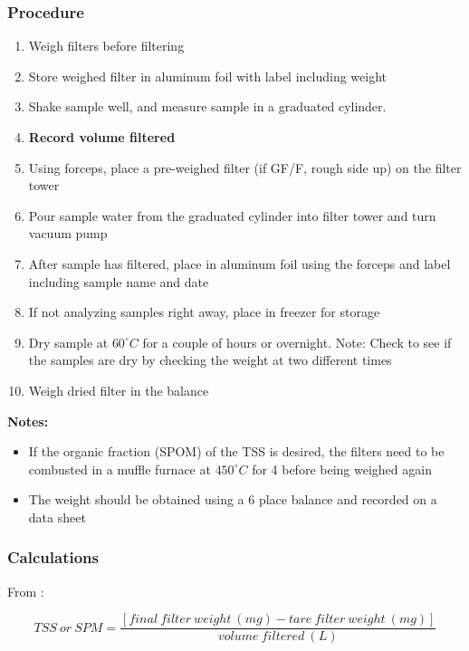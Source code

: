 \begin{appendices}
\begin{itemize}[itemsep=2pt,parsep=2pt]
\end{itemize}

\subsubsection{Procedure}
\begin{enumerate}[itemsep=2pt,parsep=2pt]
  \item Weigh filters before filtering
  \item Store weighed filter in aluminum foil with label including weight
  \item Shake sample well, and measure sample in a graduated cylinder. 
  \item {\bf Record volume filtered}
  \item Using forceps, place a pre-weighed filter (if GF/F, rough side up) on the filter tower
  \item Pour sample water from the graduated cylinder into filter tower and turn vacuum pump
  \item After sample has filtered, place in aluminum foil using the forceps and label including sample name and date
  \item If not analyzing samples right away, place in freezer for storage
  \item Dry sample at $60^\circ C$ for a couple of hours or overnight. Note: Check to see if the samples are dry by checking the weight at two different times
  \item Weigh dried filter in the balance
\end{enumerate}
{\bf Notes:}
\begin{itemize}[itemsep=2pt,parsep=2pt]
  \item If the organic fraction (SPOM) of the TSS is desired, the filters need to be combusted in a muffle furnace at $450^\circ C$ for 4 before being weighed again
  \item The weight should be obtained using a 6 place balance and recorded on a data sheet
\end{itemize}


\subsubsection{Calculations}
From \citet{Tyler2013_SPM_protocol}:

\begin{equation}
TSS~or~SPM = \frac{[final~filter~weight~(mg) - tare~filter~weight~(mg)]}{volume~filtered~(L)}
\end{equation}


\end{appendices}
